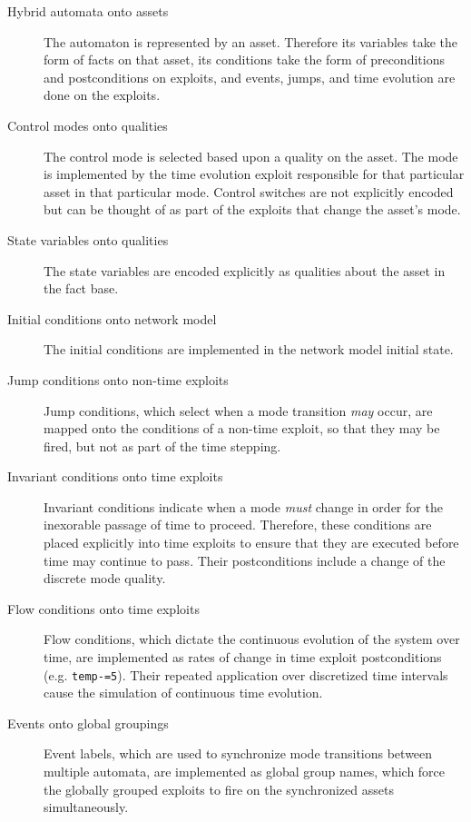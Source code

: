 \begin{description}
\item[Hybrid automata onto assets] The automaton is represented by an asset.
    Therefore its variables take the form of facts on that asset, its
    conditions take the form of preconditions and postconditions on exploits,
    and events, jumps, and time evolution are done on the exploits.
\item[Control modes onto qualities] The control mode is selected based
    upon a quality on the asset. The mode is implemented by the time
    evolution exploit responsible for that particular asset in that
    particular mode. Control switches are not explicitly encoded but can be
    thought of as part of the exploits that change the asset's mode.
\item[State variables onto qualities] The state variables are encoded
    explicitly as qualities about the asset in the fact base.
\item[Initial conditions onto network model] The initial conditions are
    implemented in the network model initial state.
\item[Jump conditions onto non-time exploits] Jump conditions,
    which select when a mode transition \emph{may} occur, are mapped onto
    the conditions of a non-time exploit, so that they may be fired, but not as
    part of the time stepping.
\item[Invariant conditions onto time exploits] Invariant conditions indicate
    when a mode \emph{must} change in order for the inexorable passage of time
    to proceed. Therefore, these conditions are placed explicitly into time 
    exploits to ensure that they are executed before time may continue to pass.
    Their postconditions include a change of the discrete mode quality.
\item[Flow conditions onto time exploits] Flow conditions, which dictate the
    continuous evolution of the system over time, are implemented as rates of
    change in time exploit postconditions (e.g. \texttt{temp-=5}). Their
    repeated application over discretized time intervals cause the
    simulation of continuous time evolution.
\item[Events onto global groupings] Event labels, which are used to synchronize
    mode transitions between multiple automata, are implemented as global group
    names, which force the globally grouped exploits to fire on the
    synchronized assets simultaneously.
\end{description}

